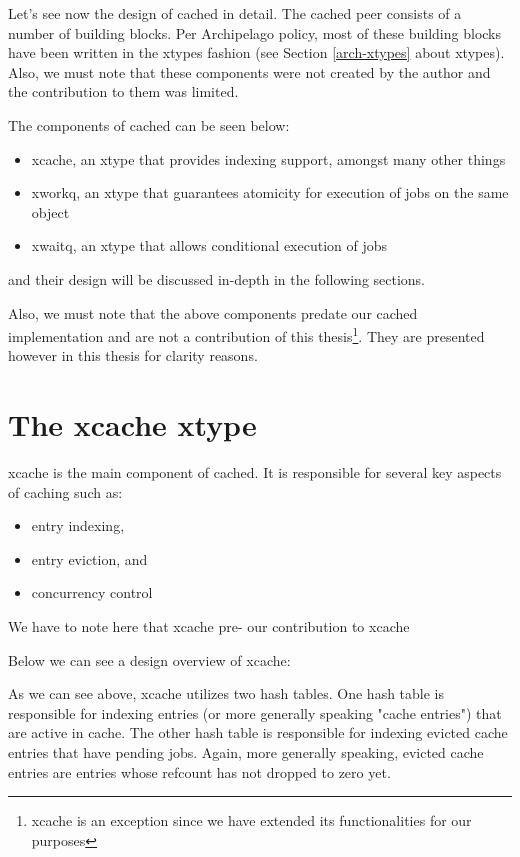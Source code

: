 Let's see now the design of cached in detail. The cached peer consists of a 
number of building blocks.  Per Archipelago policy, most of these building 
blocks have been written in the xtypes fashion (see Section \ref{arch-xtypes} 
about xtypes). Also, we must note that these components were not created by the 
author and the contribution to them was limited.

The components of cached can be seen below:
 
\begin{itemize}
	\item xcache, an xtype that provides indexing support, amongst many 
		other things
	\item xworkq, an xtype that guarantees atomicity for execution of jobs 
		on the same object
	\item xwaitq, an xtype that allows conditional execution of jobs
\end{itemize}

and their design will be discussed in-depth in the following sections.

Also, we must note that the above components predate our cached implementation 
and are not a contribution of this thesis\footnote{xcache is an exception since 
	we have extended its functionalities for our purposes}. They are 
presented however in this thesis for clarity reasons. 

\section{The xcache xtype}\label{sec:xcache-design}

xcache is the main component of cached. It is responsible for several key 
aspects of caching such as:

\begin{itemize}
	\item entry indexing,
	\item entry eviction, and
	\item concurrency control
\end{itemize}

We have to note here that xcache pre- our contribution to xcache 

Below we can see a design overview of xcache:


As we can see above, xcache utilizes two hash tables. One hash table is 
responsible for indexing entries (or more generally speaking "cache entries") 
that are active in cache.  The other hash table is responsible for indexing 
evicted cache entries that have pending jobs.  Again, more generally speaking, 
evicted cache entries are entries whose refcount has not dropped to zero yet.

